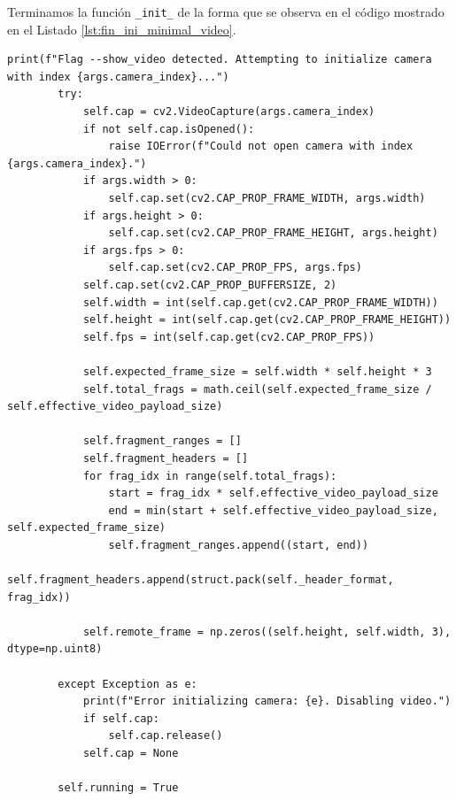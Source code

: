 Terminamos la función \texttt{\_init\_} de la forma que se observa en el código mostrado en el Listado \ref{lst:fin_ini_minimal_video}.
\vspace{\baselineskip}
\begin{lstlisting}[style=pythonstyle, caption={Fin de la inicialización de \textit{Minimal\_Video}.}, label={lst:fin_ini_minimal_video}]
print(f"Flag --show_video detected. Attempting to initialize camera with index {args.camera_index}...")
        try:
            self.cap = cv2.VideoCapture(args.camera_index)
            if not self.cap.isOpened():
                raise IOError(f"Could not open camera with index {args.camera_index}.")
            if args.width > 0:
                self.cap.set(cv2.CAP_PROP_FRAME_WIDTH, args.width)
            if args.height > 0:
                self.cap.set(cv2.CAP_PROP_FRAME_HEIGHT, args.height)
            if args.fps > 0:
                self.cap.set(cv2.CAP_PROP_FPS, args.fps)
            self.cap.set(cv2.CAP_PROP_BUFFERSIZE, 2)
            self.width = int(self.cap.get(cv2.CAP_PROP_FRAME_WIDTH))
            self.height = int(self.cap.get(cv2.CAP_PROP_FRAME_HEIGHT))
            self.fps = int(self.cap.get(cv2.CAP_PROP_FPS))

            self.expected_frame_size = self.width * self.height * 3
            self.total_frags = math.ceil(self.expected_frame_size / self.effective_video_payload_size)

            self.fragment_ranges = []
            self.fragment_headers = []
            for frag_idx in range(self.total_frags):
                start = frag_idx * self.effective_video_payload_size
                end = min(start + self.effective_video_payload_size, self.expected_frame_size)
                self.fragment_ranges.append((start, end))
                self.fragment_headers.append(struct.pack(self._header_format, frag_idx))

            self.remote_frame = np.zeros((self.height, self.width, 3), dtype=np.uint8)
            
        except Exception as e:
            print(f"Error initializing camera: {e}. Disabling video.")
            if self.cap:
                self.cap.release()
            self.cap = None

        self.running = True
\end{lstlisting}

